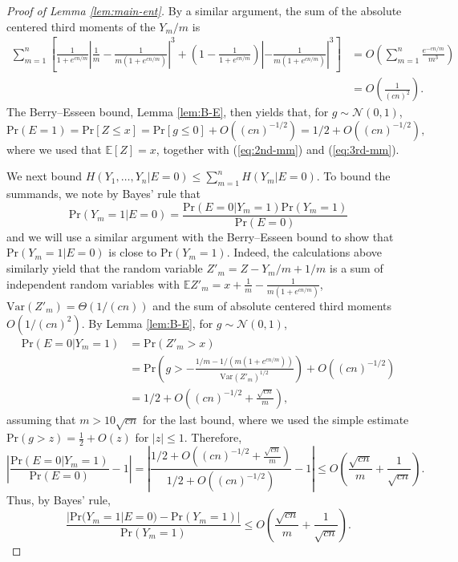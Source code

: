 \documentclass[10pt,a4paper]{amsart}
\newcommand{\pr}{\mathrm{Pr}}
\begin{document}
\begin{proof}[Proof of Lemma \ref{lem:main-ent}]
By a similar argument, the sum of the absolute centered third moments of the $Y_m/m$ is 
\begin{align}\label{eq:3rd-mm}
    \sum_{m=1}^{n} \left[\frac{1}{1+e^{cn/m}} \left|\frac{1}{m}-\frac{1}{m(1+e^{cn/m})}\right|^3 + \left(1-\frac{1}{1+e^{cn/m}}\right) \left|-\frac{1}{m(1+e^{cn/m})}\right|^3 \right] &= O\left(\sum_{m=1}^{n} \frac{e^{-cn/m}}{m^3}\right) \nonumber\\
    &= O\left(\frac{1}{(cn)^2}\right). 
\end{align}
The Berry--Esseen bound, Lemma \ref{lem:B-E}, then yields that, for $g\sim \mathcal{N}(0,1)$, 
\begin{equation}\label{eq:pZ}
    \pr(E=1) = \pr[Z\le x] = \pr[g\le 0] + O((cn)^{-1/2}) = 1/2 + O((cn)^{-1/2}),
\end{equation}
where we used that $\mathbb{E}[Z]=x$, together with (\ref{eq:2nd-mm}) and (\ref{eq:3rd-mm}).

We next bound $H(Y_1,\dots,Y_n | E=0) \le \sum_{m=1}^{n} H(Y_m|E=0)$. To bound the summands, we note by Bayes' rule that  \[\pr(Y_m = 1|E=0) = \frac{\pr(E=0|Y_m=1)\pr(Y_m=1)}{\pr(E=0)}\]
and we will use a similar argument with the Berry--Esseen bound to show that $\pr(Y_m = 1|E=0)$ is close to $\pr(Y_m=1)$. 
Indeed, the calculations above similarly yield that the random variable $Z'_m=Z-Y_m/m+1/m$ is a sum of independent random variables with $\mathbb{E}Z'_m = x + \frac{1}{m} - \frac{1}{m(1+e^{cn/m})}$, $\mathrm{Var}(Z'_m) = \Theta(1/(cn))$ and the sum of absolute centered third moments $O(1/(cn)^2)$. 
By Lemma \ref{lem:B-E}, for $g\sim \mathcal{N}(0,1)$, 
\begin{align*}
    \pr(E = 0 | Y_m=1) &= \pr(Z'_m > x) \\
    &= \pr\left(g > -\frac{1/m-1/(m(1+e^{cn/m}))}{\mathrm{Var}(Z'_m)^{1/2}}\right) + O((cn)^{-1/2}) \\
    &= 1/2 + O\left((cn)^{-1/2}+\frac{\sqrt{cn}}{m}\right),
\end{align*}
assuming that $m > 10\sqrt{cn}$ for the last bound, where we used the simple estimate $\pr(g > z) = \frac{1}{2} + O(z)$ for $|z| \le 1$. 
Therefore,
\begin{equation*}
    \left|\frac{\pr(E=0|Y_m=1)}{\pr(E=0)} - 1 \right| = \left|\frac{1/2 + O\left((cn)^{-1/2}+\frac{\sqrt{cn}}{m}\right)}{1/2 + O((cn)^{-1/2})} - 1 \right| \le O\left(\frac{\sqrt{cn}}{m} + \frac{1}{\sqrt{cn}}\right). 
\end{equation*}
Thus, by Bayes' rule,
\begin{equation}\label{eq:prob-bound-1}
    \frac{|\pr(Y_m=1|E=0) - \pr(Y_m=1)|}{\pr(Y_m=1)} \le O\left(\frac{\sqrt{cn}}{m} + \frac{1}{\sqrt{cn}}\right). 
\end{equation}


\end{proof}
\end{document}
